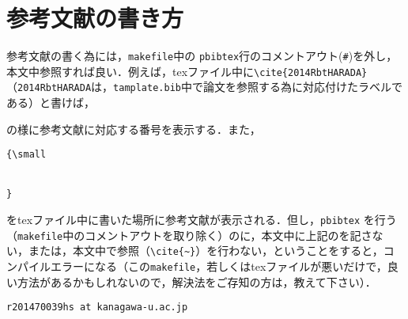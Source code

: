 \documentclass[10pt,twocolumn]{jarticle}
\begin{document}
\appendix
\section{参考文献の書き方}

参考文献の書く為には，\verb|makefile|中の \verb|pbibtex|行のコメントアウト(\verb|#|)を外し，本文中参照すれば良い．例えば，texファイル中に\verb|\cite{2014RbtHARADA}|（\verb|2014RbtHARADA|は，\verb|tamplate.bib|中で論文\cite{2014RbtHARADA}を参照する為に対応付けたラベルである）と書けば，\par
{\centering

\cite{2014RbtHARADA}

}
\noindent の様に参考文献に対応する番号を表示する．また，

\begin{verbatim}
{\small


}
\end{verbatim}
をtexファイル中に書いた場所に参考文献が表示される．但し，\verb|pbibtex| を行う（\verb|makefile|中のコメントアウトを取り除く）のに，本文中に上記の\verb||を記さない，または，本文中で参照（\verb|\cite{~}|）を行わない，ということをすると，コンパイルエラーになる（この\verb|makefile|，若しくはtexファイルが悪いだけで，良い方法があるかもしれないので，解決法をご存知の方は，教えて下さい）．\par
\noindent \verb|r201470039hs at kanagawa-u.ac.jp|
\end{document}
